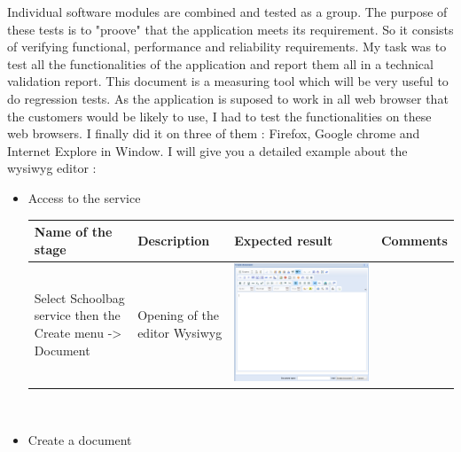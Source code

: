 Individual software modules are combined and tested as a group. The purpose
of these tests is to "proove" that the application meets its requirement. So it consists of verifying functional, performance and reliability requirements. 
My task was to test all the functionalities of the application and report them all in a technical validation report. This document is a measuring tool
which will be very useful to do regression tests. 
As the application is suposed to work in all web browser that the customers
would be likely to use, I had to test the functionalities on these web
browsers. I finally did it on three of them : Firefox, Google chrome and
Internet Explore in Window.   
I will give you a detailed example about the wysiwyg editor : \\ 
\begin{itemize}
	\item Access to the service

\begin{tabular}{|m{4cm}|m{3cm}|m{4cm}|m{2.1cm}|}
\hline
\textbf{Name of the stage} & \textbf{Description}
 & \textbf{Expected result} & \textbf{Comments} \\
\hline
Select Schoolbag service then the Create menu -> Document & 
Opening of the editor Wysiwyg & 
\begin{minipage}{0.7\textwidth}
\includegraphics[scale=0.15]{Images/wysi.png} 
\end{minipage}& 
\\
\hline
\end{tabular}
\\
	\item Create a document


\end{itemize}
